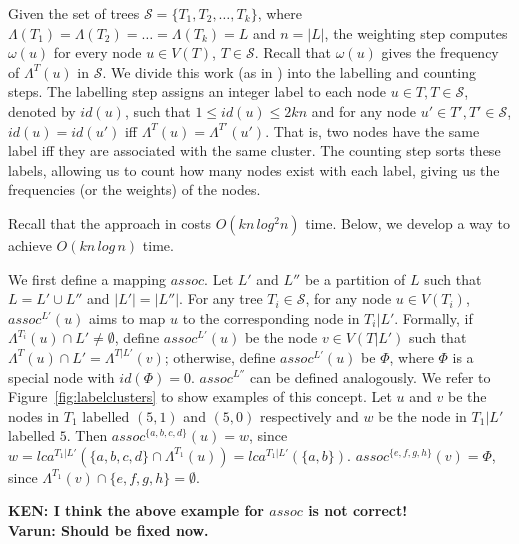 \documentclass[final,1p,times]{elsarticle}
\newcommand{\leafset}{\Lambda}
\newcommand{\weight}{\omega}
\begin{document}
    Given the set of trees $\mathcal{S} = \{T_1, T_2, \ldots, T_k\}$, where $\leafset(T_1) = \leafset(T_2) = \ldots = \leafset(T_k) = L$ and $n = |L|$, the weighting step computes $\weight(u)$ for every node $u \in V(T)$, $T \in \mathcal{S}$. Recall that $\weight(u)$ gives the frequency of $\leafset^T(u)$ in $\mathcal{S}$. We divide this work (as in \cite{gawrychowski2017faster}) into the labelling and counting steps. The labelling step assigns an integer label to each node $u \in T, T \in \mathcal{S}$, denoted by $id(u)$, such that $1 \leq id(u) \leq 2kn$ and for any node $u' \in T', T' \in \mathcal{S}$, $id(u) = id(u')$ iff $\leafset^T(u) = \leafset^{T'}(u')$. That is, two nodes have the same label iff they are associated with the same cluster. The counting step sorts these labels, allowing us to count how many nodes exist with each label, giving us the frequencies (or the weights) of the nodes.

    Recall that the approach in \cite{gawrychowski2017faster} costs $O(kn\,log^2n)$ time. Below, we develop a way to achieve $O(kn\,log\,n)$ time.

    We first define a mapping $assoc$. Let $L'$ and $L''$ be a partition of $L$ such that $L = L' \cup L''$ and $|L'|=|L''|$.
    For any tree $T_i \in \mathcal{S}$, for any node $u \in V(T_i)$, $assoc^{L'}(u)$ aims to map $u$ to the corresponding node in $T_i|L'$. Formally, if $\Lambda^{T_i}(u) \cap L' \neq \emptyset$,
    define $assoc^{L'}(u)$ be the node $v \in V(T|L')$ such that $\Lambda^T(u) \cap L' = \Lambda^{T|L'}(v)$; otherwise, define $assoc^{L'}(u)$ be $\Phi$, where $\Phi$ is a special node with $id(\Phi) = 0$.
    $assoc^{L''}$ can be defined analogously.  We refer to Figure~\ref{fig:labelclusters} to show examples of this concept. Let $u$ and $v$ be the nodes in $T_1$ labelled $(5, 1)$ and $(5, 0)$ respectively and $w$ be the node in $T_1|L'$ labelled $5$. Then $assoc^{\{a, b, c, d\}}(u) = w$, since $w = lca^{T_1|L'}(\{a, b, c, d\} \cap \leafset^{T_1}(u)) = lca^{T_1|L'}(\{a, b\})$. $assoc^{\{e, f, g, h\}}(v) = \Phi$, since $\leafset^{T_1}(v) \cap \{e, f, g, h\} = \emptyset$.

    {\bf KEN: I think the above example for $assoc$ is not correct!}\\
	{\bf Varun: Should be fixed now.}\\
\end{document}
